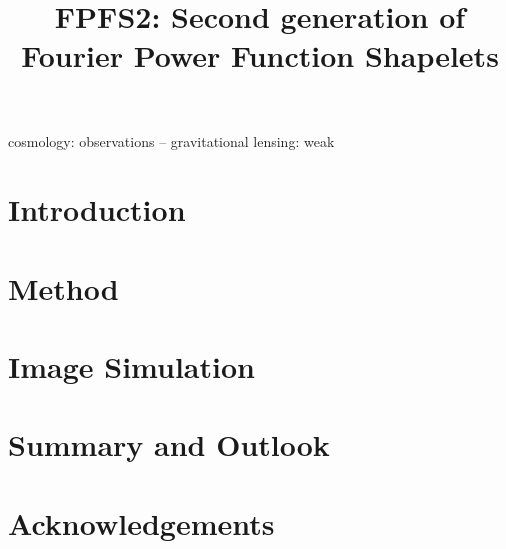 \documentclass[a4paper,fleqn,usenatbib]{mnras}
\title{FPFS2: Second generation of Fourier Power Function Shapelets}
\author[]{}
\begin{document}
\label{firstpage}
\pagerange{\pageref{firstpage}--\pageref{lastpage}}
\maketitle

\begin{abstract}
\end{abstract}

\begin{keywords}
cosmology: observations -- gravitational lensing: weak
\end{keywords}

\section{Introduction}
\label{sec:Intro}


\section{Method}
\label{sec:Method}


\section{Image Simulation}
\label{sec:sim}



\section{Summary and Outlook}
\label{sec:Summary}

\section*{Acknowledgements}



\appendix

\bsp	%
\label{lastpage}
\end{document}
